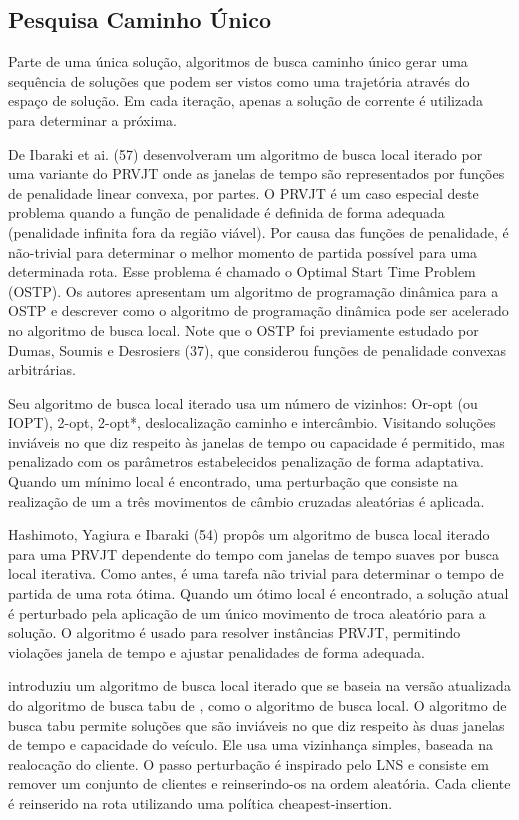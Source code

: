 \subsection{Pesquisa Caminho Único} 

Parte de uma única solução, algoritmos de busca caminho único gerar uma sequência de soluções que podem ser vistos como uma trajetória através do espaço de solução. Em cada iteração, apenas a solução de corrente é utilizada para determinar a próxima.
 
De Ibaraki et ai. (57) desenvolveram um algoritmo de busca local iterado por uma variante do PRVJT onde as janelas de tempo são representados por funções de penalidade linear convexa, por partes. O PRVJT é um caso especial deste problema quando a função de penalidade é definida de forma adequada (penalidade infinita fora da região viável). Por causa das funções de penalidade, é não-trivial para determinar o melhor momento de partida possível para uma determinada rota. Esse problema é chamado o Optimal Start Time Problem (OSTP). Os autores apresentam um algoritmo de programação dinâmica para a OSTP e descrever como o algoritmo de programação dinâmica pode ser acelerado no algoritmo de busca local. Note que o OSTP foi previamente estudado por Dumas, Soumis e Desrosiers (37), que considerou funções de penalidade convexas arbitrárias.


 Seu algoritmo de busca local iterado usa um número de vizinhos: Or-opt (ou IOPT), 2-opt, 2-opt*, deslocalização caminho e intercâmbio. Visitando soluções inviáveis no que diz respeito às janelas de tempo ou capacidade é permitido, mas penalizado com os parâmetros estabelecidos penalização de forma adaptativa. Quando um mínimo local é encontrado, uma perturbação que consiste na realização de um a três movimentos de câmbio cruzadas aleatórias é aplicada.

 
 
Hashimoto, Yagiura e Ibaraki (54) propôs um algoritmo de busca local iterado para uma PRVJT dependente do tempo com janelas de tempo suaves por busca local iterativa. Como antes, é uma tarefa não trivial para determinar o tempo de partida de uma rota ótima. Quando um ótimo local é encontrado, a solução atual é perturbado pela aplicação de um único movimento de troca aleatório para a solução. O algoritmo é usado para resolver instâncias PRVJT, permitindo violações janela de tempo e ajustar penalidades de forma adequada.
 
 
\cite{cordeau2011} introduziu um algoritmo de busca local iterado que se baseia na versão atualizada do algoritmo de busca tabu de \cite{cordeau04}, como o algoritmo de busca local. O algoritmo de busca tabu permite soluções que são inviáveis no que diz respeito às duas janelas de tempo e capacidade do veículo. Ele usa uma vizinhança simples, baseada na realocação do cliente. O passo perturbação é inspirado pelo LNS e consiste em remover um conjunto de clientes e reinserindo-os na ordem aleatória. Cada cliente é reinserido na rota utilizando uma política cheapest-insertion.

